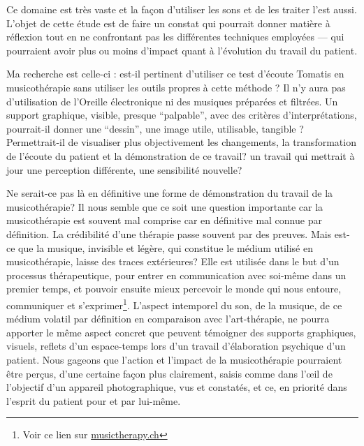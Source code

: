 Ce domaine est très vaste et la façon d'utiliser les sons et de les
traiter l'est aussi. L'objet de cette étude est de faire un constat
qui pourrait donner matière à réflexion tout en ne confrontant pas les
différentes techniques employées --- qui pourraient avoir plus ou %
moins d'impact quant à l'évolution du travail du patient.

Ma recherche est celle-ci : est-il pertinent d'utiliser ce test
d'écoute Tomatis en musicothérapie sans utiliser les outils propres à
cette méthode ? Il n'y aura pas d'utilisation de l'Oreille
électronique ni des musiques préparées et filtrées.  Un support
graphique, visible, presque ``palpable'', avec des critères
d'interprétations, pourrait-il donner une ``dessin'', une image utile,
utilisable, tangible ? Permettrait-il de visualiser plus objectivement
les changements, la transformation de l'écoute du patient et la
démonstration de ce travail? %
un travail %
qui mettrait à jour une perception différente, une sensibilité
nouvelle?

Ne serait-ce %
pas là en définitive une forme de démonstration du
travail de la musicothérapie?  Il nous semble que ce soit une
question importante car la musicothérapie est souvent mal comprise car
en définitive mal connue par définition. %
La crédibilité d'une thérapie
passe souvent par des preuves. Mais est-ce que la musique, invisible
et légère, qui constitue le médium utilisé en musicothérapie, laisse
des traces extérieures?
Elle est utilisée dans le but d'un processus
thérapeutique, pour entrer en communication avec soi-même dans un
premier temps, et pouvoir ensuite mieux percevoir le monde qui nous
entoure, communiquer et s'exprimer\footnote{%
Voir ce lien sur \href{http://www.musictherapy.ch/fr/musicotherapie/quest-ce-que-la-musicotherapie/}{musictherapy.ch}}.
L'aspect intemporel du son, de la musique, de ce médium volatil par
définition en comparaison avec l'art-thérapie, ne pourra apporter le
même aspect concret que peuvent témoigner des supports graphiques,
visuels, reflets d'un espace-temps lors d'un travail d'élaboration
psychique d'un patient.  Nous gageons que l'action et l'impact de la
musicothérapie pourraient être perçus, d'une certaine façon plus
clairement, saisis comme dans l'\oe il de l'objectif d'un appareil
photographique, vus et constatés, et ce, en priorité dans l'esprit du
patient pour et par lui-même.

